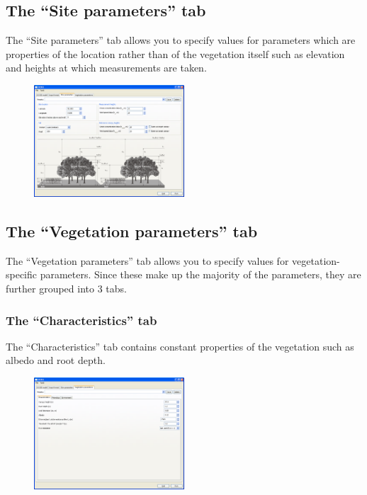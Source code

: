 \documentclass[10pt,a4paper]{article}
\begin{document}
\subsection{The ``Site parameters'' tab}

The ``Site parameters'' tab allows you to specify values for parameters which are properties of the 
location rather than of the vegetation itself such as elevation and heights at which measurements 
are taken.

\begin{figure}[H]
\centering
\includegraphics[width=0.5\textwidth]{images/ss/site-params-panel}
\end{figure}


\subsection{The ``Vegetation parameters'' tab}

The ``Vegetation parameters'' tab allows you to specify values for vegetation-specific parameters.  
Since these make up the majority of the parameters, they are further grouped into 3 tabs.

\subsubsection{The ``Characteristics'' tab}

The ``Characteristics'' tab contains constant properties of the vegetation such as albedo and root 
depth.

\begin{figure}[H]
\centering
\includegraphics[width=0.5\textwidth]{images/ss/veg-characteristics-panel}
\end{figure}
\end{document}
